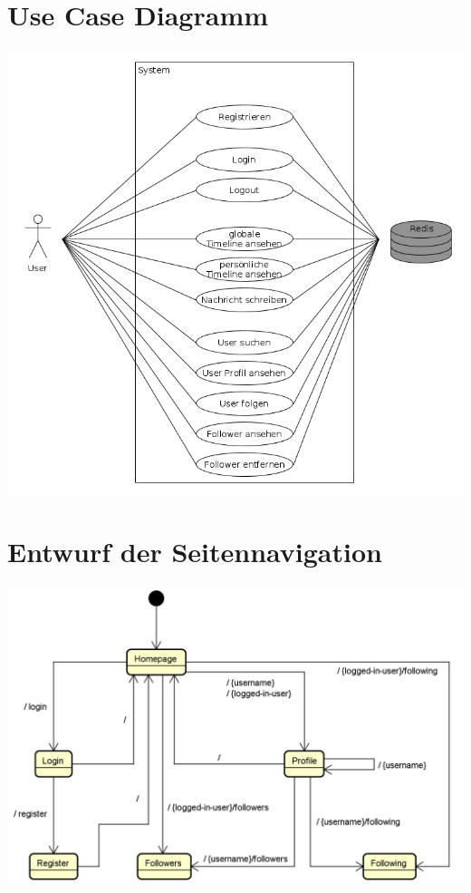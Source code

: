 \documentclass[
    a4paper
]{scrreprt}
\begin{document}
    \section{Use Case Diagramm}
    \includegraphics[width=\textwidth]{./images/useCaseDiagramm.png}
 
    \section{Entwurf der Seitennavigation}
	     \includegraphics[width=\textwidth]{./images/state-machine.png}
        
\end{document}
